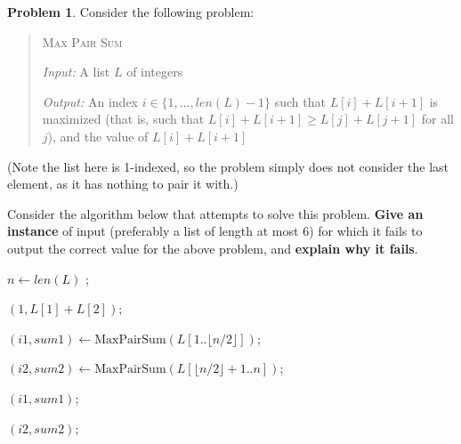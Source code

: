 \documentclass[11pt]{article}
\theoremstyle{definition}
\theoremstyle{definition}
\newtheorem{required}{Problem}
\theoremstyle{definition}
\begin{document}
\begin{required} \label{dandc}
Consider the following problem:
\begin{quotation}
\noindent \textsc{Max Pair Sum}

\noindent \textit{Input:} A list $L$ of integers

\noindent \textit{Output:} An index $i \in \{1,\dotsc,len(L)-1\}$ such that $L[i]+L[i+1]$ is maximized (that is, such that $L[i] + L[i+1] \geq L[j] + L[j+1]$ for all $j$), and the value of $L[i]+L[i+1]$
\end{quotation}
(Note the list here is 1-indexed, so the problem simply does not consider the last element, as it has nothing to pair it with.)

Consider the algorithm below that attempts to solve this problem. \textbf{Give an instance} of input (preferably a list of length at most 6) for which it fails to output the correct value for the above problem, and \textbf{explain why it fails}.

\begin{algorithm}
\caption{Proposed divide-and-conquer algorithm for the Max Pair Sum problem}
\begin{algorithmic}[1]
$n \gets len(L)$
\Return;
\EndIf

\Return $(1,L[1] + L[2])$;
\EndIf


\State $(i1,sum1) \gets \text{MaxPairSum}(L[1..\lfloor n/2 \rfloor])$;

\State $(i2,sum2) \gets \text{MaxPairSum}(L[\lfloor n/2 \rfloor + 1..n])$;


\State \Return $(i1,sum1)$;
\Else

\State \Return $(i2,sum2)$;

\EndIf
\EndProcedure
\end{algorithmic}
\end{algorithm}


\end{required}
\end{document}
